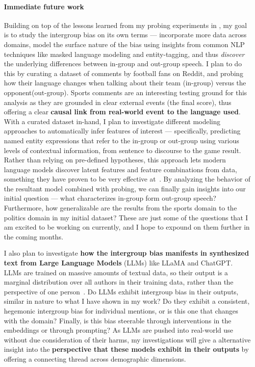 \documentclass[11pt, letterpaper, biblatex]{practical-report}
\begin{document}
\paragraph{Immediate future work} Building on top of the lessons learned from my probing experiments in \citep{govindarajan-etal-2023-counterfactual}, my goal is to study the intergroup bias on its own terms --- incorporate more data across domains, model the surface nature of the bias using insights from common NLP techniques like masked language modeling and entity-tagging, and thus \emph{discover} the underlying differences between in-group and out-group speech. I plan to do this by curating a dataset of comments by football fans on Reddit, and probing how their language changes when talking about their team (in-group) versus the opponent(out-group). Sports comments are an interesting testing ground for this analysis as they are grounded in clear external events (the final score), thus offering a clear \textbf{causal link from real-world event to the language used}. With a curated dataset in-hand, I plan to investigate different modeling approaches to automatically infer features of interest --- specifically, predicting named entity expressions that refer to the in-group or out-group using various levels of contextual information, from sentence to discourse to the game result. Rather than relying on pre-defined hypotheses, this approach lets modern language models discover latent features and feature combinations from data, something they have proven to be very effective at~\citep{devlin-etal-2019-bert}. By analyzing the behavior of the resultant model combined with probing, we can finally gain insights into our initial question --- what characterizes in-group form out-group speech?  Furthermore, how generalizable are the results from the sports domain to the politics domain in my initial dataset? These are just some of the questions that I am excited to be working on currently, and I hope to expound on them further in the coming months.

I also plan to investigate \textbf{how the intergroup bias manifests in synthesized text from Large Language Models} (LLMs) like LLaMA and ChatGPT. LLMs are trained on massive amounts of textual data, so their output is a marginal distribution over all authors in their training data, rather than the perspective of one person~\citep{andreas-2022-language}. Do LLMs exhibit intergroup bias in their outputs, similar in nature to what I have shown in my work? Do they exhibit a consistent, hegemonic intergroup bias for individual mentions, or is this one that changes with the domain? Finally, is this bias steerable through interventions in the embeddings or through prompting? As LLMs are pushed into real-world use without due consideration of their harms, my investigations will give a alternative insight into the \textbf{perspective that these models exhibit in their outputs} by offering a connecting thread across demographic dimensions.
\end{document}
